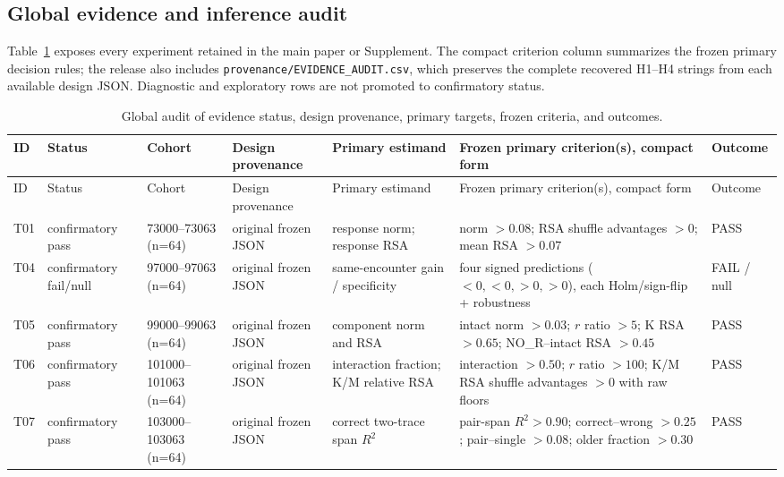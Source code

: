 \documentclass[11pt]{article}
\begin{document}
\subsection{Global evidence and inference audit}

Table~\ref{tab:global-audit} exposes every experiment retained in the main paper or Supplement. The compact criterion column summarizes the frozen primary decision rules; the release also includes \texttt{provenance/EVIDENCE\_AUDIT.csv}, which preserves the complete recovered H1--H4 strings from each available design JSON. Diagnostic and exploratory rows are not promoted to confirmatory status.

\begin{landscape}
\tiny
\setlength\LTleft{0pt}\setlength\LTright{0pt}
\renewcommand{\arraystretch}{1.12}
\begin{longtable}{p{0.65cm}p{2.25cm}p{2.55cm}p{3.15cm}p{3.9cm}p{6.1cm}p{2.2cm}}
\caption{Global audit of evidence status, design provenance, primary targets, frozen criteria, and outcomes.}\label{tab:global-audit}\\
\toprule
ID & Status & Cohort & Design provenance & Primary estimand & Frozen primary criterion(s), compact form & Outcome\\
\midrule
\endfirsthead
\toprule
ID & Status & Cohort & Design provenance & Primary estimand & Frozen primary criterion(s), compact form & Outcome\\
\midrule
\endhead
T01 & confirmatory pass & 73000--73063 (n=64) & original frozen JSON & response norm; response RSA & norm $>0.08$; RSA shuffle advantages $>0$; mean RSA $>0.07$ & PASS \\
T04 & confirmatory fail/null & 97000--97063 (n=64) & original frozen JSON & same-encounter gain / specificity & four signed predictions ($<0,<0,>0,>0$), each Holm/sign-flip + robustness & FAIL / null \\
T05 & confirmatory pass & 99000--99063 (n=64) & original frozen JSON & component norm and RSA & intact norm $>0.03$; $r$ ratio $>5$; K RSA $>0.65$; NO\_R--intact RSA $>0.45$ & PASS \\
T06 & confirmatory pass & 101000--101063 (n=64) & original frozen JSON & interaction fraction; K/M relative RSA & interaction $>0.50$; $r$ ratio $>100$; K/M RSA shuffle advantages $>0$ with raw floors & PASS \\
T07 & confirmatory pass & 103000--103063 (n=64) & original frozen JSON & correct two-trace span $R^2$ & pair-span $R^2>0.90$; correct--wrong $>0.25$; pair--single $>0.08$; older fraction $>0.30$ & PASS \\

\end{longtable}
\end{landscape}
\end{document}
